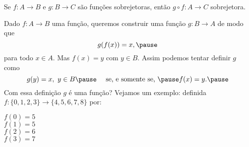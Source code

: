 \documentclass{beamer}
\begin{document}
    \begin{frame}
        \begin{proposicao}
            Se $f : A \to B$ \pause e $g : B \to C$ \pause s{\~a}o fun\c{c}\~oes sobrejetoras, \pause ent{\~a}o $g\circ f : A \to C$  sobrejetora.
        \end{proposicao}
    \end{frame}
        \begin{frame}
        Dado $f : A \to B$ \pause uma fun\c{c}{\~a}o, \pause queremos construir uma fun\c{c}\~ao $g : B \to A$ \pause de modo que
        \[
            g(f(x)) = x,\pause
        \]
        para todo $x \in A$. \pause Mas $f(x) = y$ \pause com $y \in B$. \pause Assim podemos tentar definir $g$ \pause como
        \[
            g(y) = x,\ y \in B \pause \quad \mbox{ se, e somente se, } \pause f(x) = y.\pause
        \]
        Com essa defini\c{c}\~ao \pause $g$ \'e uma fun\c{c}\~ao? \pause Vejamos um exemplo: \pause definida $f : \{0,1,2,3\} \to \{4,5,6,7,8\}$ por:\pause
        \begin{center}
            $f(0) = 5$ \pause\\
            \vspace{.3cm}
            $f(1) = 5$\pause\\
            \vspace{.3cm}
            $f(2) = 6$\pause\\
            \vspace{.3cm}
            $f(3) = 7$
        \end{center}
    \end{frame}
\end{document}
